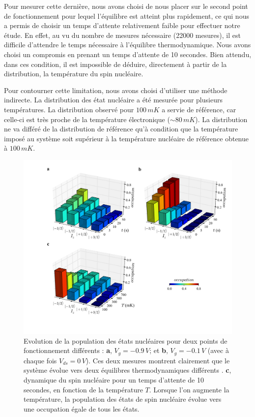 Pour mesurer cette dernière, nous avons choisi de nous placer sur le second point de fonctionnement pour lequel l'équilibre est atteint plus rapidement, ce qui nous  a permis de choisir un temps d'attente relativement faible pour effectuer notre étude. En effet, au vu du nombre de mesures nécessaire (22000 mesures), il est difficile d'attendre le temps nécessaire à l'équilibre thermodynamique. Nous avons choisi un compromis en prenant un temps d'attente de 10 secondes. Bien attendu, dans ces condition, il est impossible de déduire, directement à partir de la distribution, la température du spin nucléaire.

Pour contourner cette limitation, nous avons choisi d'utiliser une méthode indirecte. La distribution des état nucléaire a été mesurée pour plusieurs températures. La distribution observé pour $100\,mK$ a servie de référence, car celle-ci est très proche de la température électronique ($\sim 80\,mK$). La distribution ne va différé de la distribution de référence qu'à condition que la température imposé au système soit supérieur à la température nucléaire de référence obtenue à $100\,mK$.

\begin{figure}[h!]
\includegraphics[scale=0.45]{Resultats/SpinTemp/SpinTemp.pdf} 
\caption{Evolution de la population des états nucléaires pour deux points de fonctionnement différents : \textbf{a}, $V_g = -0.9\,V$; et \textbf{b}, $V_g = -0.1\,V$ (avec à chaque fois $V_{ds} = 0\,V$). Ces deux mesures montrent clairement que le système évolue vers deux équilibres thermodynamiques différents . \textbf{c}, dynamique du spin nucléaire pour un temps d'attente de 10 secondes, en fonction de la température $T$. Lorsque l'on augmente la température, la population des états de spin nucléaire évolue vers une occupation égale de tous les états.}
\label{dynamique_spin}
\end{figure}


